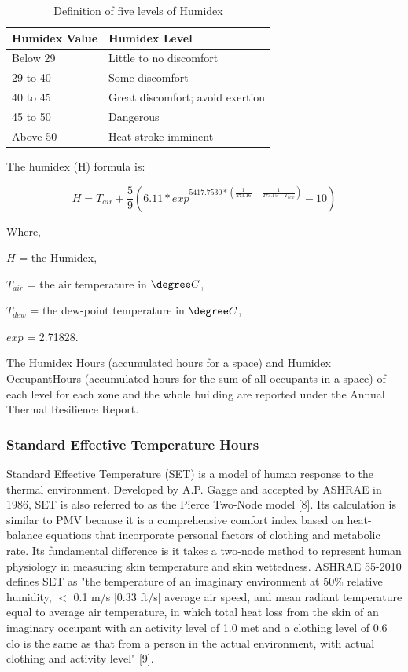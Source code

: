 \begin{table}
\centering
\caption{Definition of five levels of Humidex \protect \label{table:humidex-chart}} \tabularnewline
\begin{tabular}{ |p{1in}|p{3in}|  }
\hline
      \textbf{Humidex Value} & \textbf{Humidex Level} \\ \hline
      Below 29 & Little to no discomfort \\ \hline
      29 to 40 & Some discomfort \\ \hline
      40 to 45 & Great discomfort; avoid exertion \\ \hline
      45 to 50 & Dangerous \\ \hline
      Above 50 & Heat stroke imminent \\ \hline
\end{tabular}
\end{table}

The humidex (H) formula is:

\begin{equation}  \label{eq:rm-5}
H = T_{air} + \frac{5}{9}(6.11 * exp^{5417.7530 * (\frac{1}{273.16} - \frac{1}{273.15 + T_{dew}})} - 10)
\end{equation}

Where,

$H$ = the Humidex,

$T_{air}$ = the air temperature in $\degree C$,

$T_{dew}$ = the dew-point temperature in $\degree C$,

$exp$ = 2.71828.

The Humidex Hours (accumulated hours for a space) and Humidex OccupantHours (accumulated hours for the sum of all occupants in a space) of each level for each zone and the whole building are reported under the Annual Thermal Resilience Report.

\subsubsection{Standard Effective Temperature Hours}\label{set-hour}
Standard Effective Temperature (SET) is a model of human response to the thermal environment. Developed by A.P. Gagge and accepted by ASHRAE in 1986, SET is also referred to as the Pierce Two-Node model [8]. Its calculation is similar to PMV because it is a comprehensive comfort index based on heat-balance equations that incorporate personal factors of clothing and metabolic rate. Its fundamental difference is it takes a two-node method to represent human physiology in measuring skin temperature and skin wettedness. ASHRAE 55-2010 defines SET as "the temperature of an imaginary environment at 50\% relative humidity, $<$ 0.1 m/s [0.33 ft/s] average air speed, and mean radiant temperature equal to average air temperature, in which total heat loss from the skin of an imaginary occupant with an activity level of 1.0 met and a clothing level of 0.6 clo is the same as that from a person in the actual environment, with actual clothing and activity level" [9].

